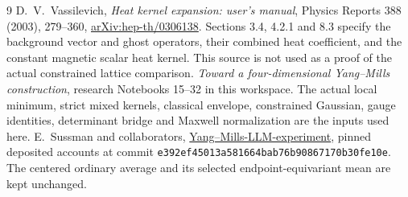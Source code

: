 \begin{thebibliography}{9}
D.~V.~Vassilevich,
\emph{Heat kernel expansion: user's manual},
Physics Reports 388 (2003), 279--360,
\href{https://arxiv.org/abs/hep-th/0306138}{arXiv:hep-th/0306138}.
Sections 3.4, 4.2.1 and 8.3 specify the background vector
and ghost operators, their combined heat coefficient,
and the constant magnetic scalar heat kernel.
This source is not used as a proof of the actual constrained
lattice comparison.
\emph{Toward a four-dimensional Yang--Mills construction},
research Notebooks 15--32 in this workspace.
The actual local minimum, strict mixed kernels, classical
envelope, constrained Gaussian, gauge identities, determinant
bridge and Maxwell normalization are the inputs used here.
E.~Sussman and collaborators,
\href{https://github.com/ethanwsussman/Yang--Mills-LLM-experiment}
{Yang--Mills-LLM-experiment}, pinned deposited accounts at
commit \texttt{e392ef45013a581664bab76b90867170b30fe10e}.
The centered ordinary average and its selected
endpoint-equivariant mean are kept unchanged.
\end{thebibliography}


